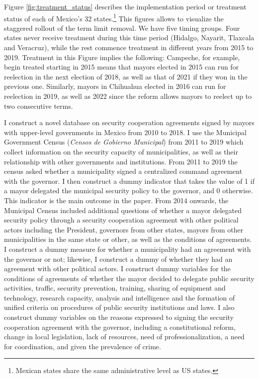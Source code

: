 \documentclass[12pt]{amsart}
\makeatletter
\def\section{\@startsection{section}{1}
	\z@{1.0\linespacing\@plus\linespacing}{.5\linespacing}{\Large}}
\numberwithin{equation}{section}
\theoremstyle{definition}
\theoremstyle{definition}
\theoremstyle{definition}
\makeatother
\begin{document}
Figure \ref{fig:treatment_status} describes the implementation period or treatment status of each of Mexico's 32 states.\footnote{Mexican states share the same administrative level as US states.} This figures allows to visualize the staggered rollout of the term limit removal. We have five timing groups. Four states never receive treatment during this time period (Hidalgo, Nayarit, Tlaxcala and Veracruz), while the rest commence treatment in different years from 2015 to 2019. %
Treatment in this Figure implies the following: Campeche, for example, begin treated starting in 2015 means that mayors elected in 2015 can run for reelection in the next election of 2018, as well as that of 2021 if they won in the previous one. Similarly, mayors in Chihuahua elected in 2016 can run for reelection in 2019, as well as 2022 since the reform allows mayors to reelect up to two consecutive terms.  

\section{Data and Research Design \label{sec:data}}  

I construct a novel database on security cooperation agreements signed by mayors with upper-level governments in Mexico from 2010 to 2018. I use the Municipal Government Census (\emph{Censos de Gobierno Municipal}) from 2011 to 2019 which collect information on the security capacity of municipalities, as well as their relationship with other governments and institutions. From 2011 to 2019 the census asked whether a municipality signed a centralized command agreement with the governor. I then construct a dummy indicator that takes the value of 1 if a mayor delegated the municipal security policy to the governor, and 0 otherwise. This indicator is the main outcome in the paper. From 2014 onwards, the Municipal Census included additional questions of whether a mayor delegated security policy through a security cooperation agreement with other political actors including the President, governors from other states, mayors from other municipalities in the same state or other, as well as the conditions of agreements. I construct a dummy measure for whether a municipality had an agreement with the governor or not; likewise, I construct a dummy of whether they had an agreement with other political actors. I construct dummy variables for the conditions of agreements of whether the mayor decided to delegate public security activities, traffic, security prevention, training, sharing of equipment and technology, research capacity, analysis and intelligence and the formation of unified criteria on procedures of public security institutions and laws. I also construct dummy variables on the reasons expressed to signing the security cooperation agreement with the governor, including a constitutional reform, change in local legislation, lack of resources, need of professionalization, a need for coordination, and given the prevalence of crime.
 
\end{document}
